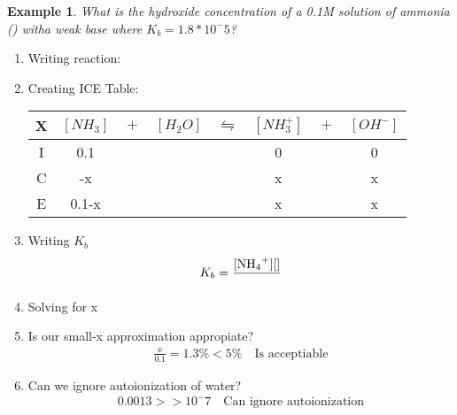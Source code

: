 \documentclass{article}  %
\newtheorem{exmp}{Example}
\begin{document}
\begin{exmp}
    What is the hydroxide concentration of a 0.1M solution of ammonia () witha  weak base where $K_b = 1.8*10^-5$?
\end{exmp}
\begin{enumerate}
    \item Writing reaction:
    \item Creating ICE Table:
    \begin{tabular}{c|c@{}c@{}c@{}c@{}c@{}c@{}c}
        \hline
        X   & $[NH_3]$ & ${}+{}$ & $[H_2O]$ & ${}\leftrightharpoons{}$ & $[NH_3^+]$ & ${}+{}$ & $[OH^-]$ \\
        \hline
        I   &  0.1   &&     &&  0   && 0  \\
        C   &  -x    &&     &&  x   && x  \\
        E   &  0.1-x &&     &&  x   && x  \\      
    \end{tabular}
    \item Writing $K_b$
    \begin{equation*}
        \begin{aligned}
            K_b = \ce{\frac{[NH4+][]}{}} %
        \end{aligned}
    \end{equation*}
    \item Solving for x
    \item Is our small-x approximation appropiate?
    \begin{equation*}
        \begin{aligned}
            \frac{x}{0.1} = 1.3\% < 5\% \quad \text{Is acceptiable}
        \end{aligned}
    \end{equation*}
    \item Can we ignore autoionization of water?
    \begin{equation*}
        \begin{aligned}
            0.0013 >> 10^-7 \quad \text{Can ignore autoionization}
        \end{aligned}
    \end{equation*}
\end{enumerate}
\end{document}
